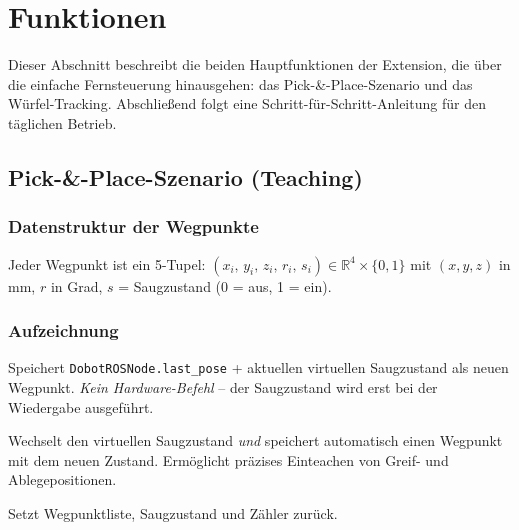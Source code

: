 \documentclass[11pt,a4paper]{article}
\begin{document}
\section{Funktionen}
\label{sec:funktionen}

Dieser Abschnitt beschreibt die beiden Hauptfunktionen der Extension,
die über die einfache Fernsteuerung hinausgehen: das Pick-\&-Place-Szenario
und das Würfel-Tracking. Abschließend folgt eine Schritt-für-Schritt-Anleitung
für den täglichen Betrieb.

\subsection{Pick-\&-Place-Szenario (Teaching)}
\label{sec:teachin}

\subsubsection{Datenstruktur der Wegpunkte}

Jeder Wegpunkt ist ein 5-Tupel:
$(x_i,\, y_i,\, z_i,\, r_i,\, s_i) \in \mathbb{R}^4 \times \{0, 1\}$
mit $(x,y,z)$ in mm, $r$ in Grad, $s$ = Saugzustand (0 = aus, 1 = ein).

\subsubsection{Aufzeichnung}

\begin{description}[leftmargin=4.5cm, style=nextline]
  \item[\textit{Rec Punkt}]
    Speichert \texttt{DobotROSNode.last\_pose} + aktuellen
    virtuellen Saugzustand als neuen Wegpunkt.
    \emph{Kein Hardware-Befehl} -- der Saugzustand wird erst
    bei der Wiedergabe ausgeführt.

  \item[\textit{Saugen EIN/AUS}]
    Wechselt den virtuellen Saugzustand \emph{und} speichert
    automatisch einen Wegpunkt mit dem neuen Zustand.
    Ermöglicht präzises Einteachen von Greif- und Ablegepositionen.

  \item[\textit{Löschen}]
    Setzt Wegpunktliste, Saugzustand und Zähler zurück.
\end{description}
\end{document}
